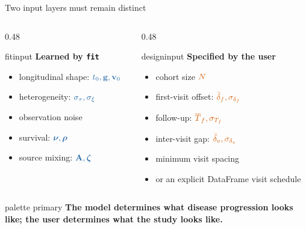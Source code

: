 \documentclass{beamer}
\newcommand{\takeaway}[1]{%
  \begin{beamercolorbox}[rounded=true,sep=0.7ex,wd=\linewidth]{palette primary}
    \centering\bfseries #1
  \end{beamercolorbox}}
\newcommand{\softbox}[2]{%
  \begin{beamercolorbox}[rounded=true,sep=0.8ex,wd=\linewidth]{#1}#2\end{beamercolorbox}}
\newcommand{\fitparam}[1]{\textcolor{FitBlue}{#1}}
\newcommand{\designparam}[1]{\textcolor{DesignOrange}{#1}}
\begin{document}
\begin{frame}{Two input layers must remain distinct}
  \begin{columns}[T,onlytextwidth]
    \begin{column}{0.48\textwidth}
      \softbox{fitinput}{
        \centering\textbf{Learned by \texttt{fit}}
      }
      \begin{itemize}
        \item longitudinal shape: $\fitparam{t_0,\mathbf g,\mathbf v_0}$
        \item heterogeneity: $\fitparam{\sigma_\tau,\sigma_\xi}$
        \item observation noise
        \item survival: $\fitparam{\boldsymbol\nu,\boldsymbol\rho}$
        \item source mixing: $\fitparam{\mathbf A,\boldsymbol\zeta}$
      \end{itemize}
    \end{column}
    \pause
    \begin{column}{0.48\textwidth}
      \softbox{designinput}{
        \centering\textbf{Specified by the user}
      }
      \begin{itemize}
        \item cohort size $\designparam{N}$
        \item first-visit offset: $\designparam{\bar\delta_f,\sigma_{\delta_f}}$
        \item follow-up: $\designparam{\overline T_f,\sigma_{T_f}}$
        \item inter-visit gap: $\designparam{\bar\delta_v,\sigma_{\delta_v}}$
        \item minimum visit spacing
        \item or an explicit DataFrame visit schedule
      \end{itemize}
    \end{column}
  \end{columns}
  \pause
  \vfill
  \takeaway{The model determines what disease progression looks like; the user determines what the study looks like.}
\end{frame}
\end{document}
